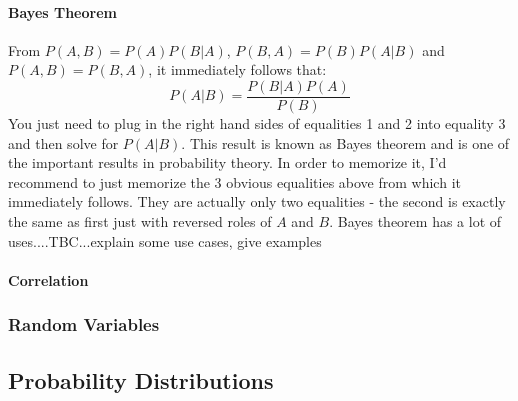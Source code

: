 





\paragraph{Bayes Theorem}
From $P(A, B) = P(A) P(B|A)$,  $P(B, A) = P(B) P(A|B)$ and $P(A, B) = P(B, A)$, it immediately follows that:
\begin{equation}
\label{Eq:BayesTheorem}
 P(A|B) = \frac{P(B|A) P(A)}{P(B)}
\end{equation}
You just need to plug in the right hand sides of equalities 1 and 2 into equality 3 and then solve for $ P(A|B)$. This result is known as Bayes theorem and is one of the important results in probability theory. In order to memorize it, I'd recommend to just memorize the 3 obvious equalities above from which it immediately follows. They are actually only two equalities - the second is exactly the same as first just with reversed roles of $A$ and $B$. Bayes theorem has a lot of uses....TBC...explain some use cases, give examples







\paragraph{Correlation}


\subsubsection{Random Variables}


\subsection{Probability Distributions}


